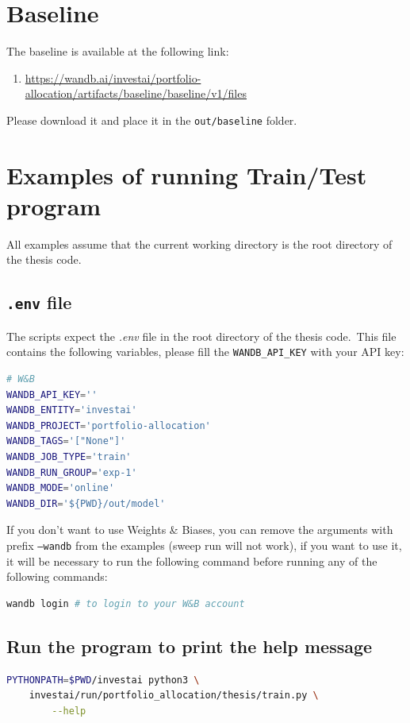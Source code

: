 \documentclass[../xlapes02]{subfiles}
\begin{document}
    \section{Baseline}\label{sec:baseline}
    The baseline is available at the following link:
    \begin{enumerate}
        \item \url{https://wandb.ai/investai/portfolio-allocation/artifacts/baseline/baseline/v1/files}
    \end{enumerate}
    Please download it and place it in the \texttt{out/baseline} folder.


    \section{Examples of running Train/Test program}\label{sec:examples-of-running-train/test-program}
    All examples assume that the current working directory is the root directory of the thesis code.

    \subsection{\texttt{.env} file}\label{subsec:texttt{.env}-file}
    The scripts expect the \emph{.env} file in the root directory of the thesis code.\ This file contains the following variables, please fill the \texttt{WANDB\_API\_KEY} with your API key:
    \begin{lstlisting}[language=bash,label={lst:env-file}]
# W&B
WANDB_API_KEY=''
WANDB_ENTITY='investai'
WANDB_PROJECT='portfolio-allocation'
WANDB_TAGS='["None"]'
WANDB_JOB_TYPE='train'
WANDB_RUN_GROUP='exp-1'
WANDB_MODE='online'
WANDB_DIR='${PWD}/out/model'
    \end{lstlisting}
    If you don't want to use Weights \& Biases, you can remove the arguments with prefix \texttt{--wandb} from the examples (sweep run will not work), if you want to use it, it will be necessary to run the following command before running any of the following commands:
    \begin{lstlisting}[language=bash,label={lst:wandb-login}]
wandb login # to login to your W&B account
    \end{lstlisting}

    \subsection{Run the program to print the help message}\label{subsec:run-the-program-to-print-the-help-message}
    \begin{lstlisting}[language=bash,label={lst:help}]
PYTHONPATH=$PWD/investai python3 \
    investai/run/portfolio_allocation/thesis/train.py \
        --help
    \end{lstlisting}
\end{document}
